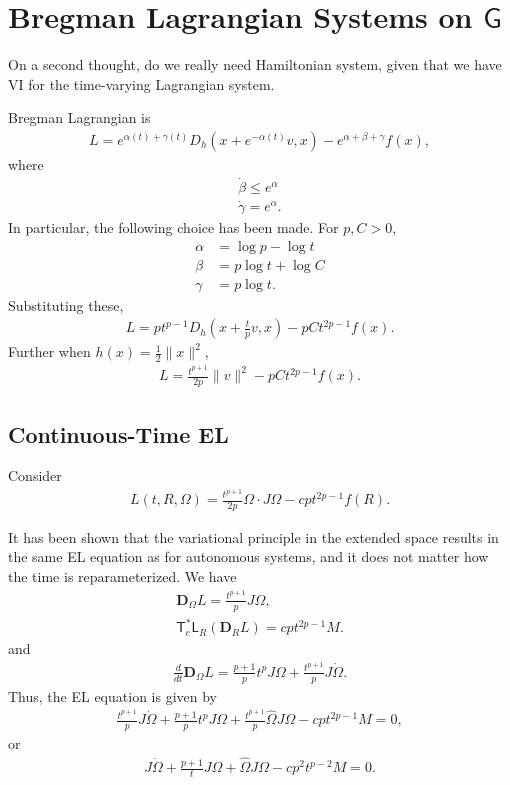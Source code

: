 \documentclass[letterpaper, 10pt, conference]{ieeeconf}
\newcommand{\G}{\ensuremath{\mathsf{G}}}
\newcommand{\T}{\ensuremath{\mathsf{T}}}
\renewcommand{\L}{\ensuremath{\mathsf{L}}}
\newcommand{\D}{\ensuremath{\mathbf{D}}}
\begin{document}
\section{Bregman Lagrangian Systems on $\G$}

On a second thought, do we really need Hamiltonian system, given that we have VI for the time-varying Lagrangian system. 

Bregman Lagrangian is
\begin{align*}
    L = e^{\alpha(t)+\gamma(t)} D_h(x+ e^{-\alpha(t)} v, x) - e^{\alpha+\beta+\gamma} f(x),
\end{align*}
where 
\begin{align*}
    \dot\beta \leq e^\alpha\\
    \dot \gamma = e^\alpha.
\end{align*}
In particular, the following choice has been made. 
For $p,C>0$,
\begin{align*}
    \alpha & = \log p - \log t\\
    \beta & = p\log t + \log C\\
    \gamma & = p \log t.
\end{align*}
Substituting these,
\begin{align*}
    L = p t^{p-1} D_h(x+ \frac{t}{p} v, x) - p C t^{2p-1} f(x).
\end{align*}
Further when $h(x)=\frac{1}{2}\|x\|^2$, 
\begin{align*}
    L = \frac{t^{p+1}}{2p} \| v\|^2 - p C t^{2p-1} f(x).
\end{align*}


\subsection{Continuous-Time EL}

Consider
\begin{align*}
    L(t,R,\Omega) = \frac{t^{p+1}}{2p} \Omega\cdot J\Omega - cpt^{2p-1} f(R).
\end{align*}

It has been shown that the variational principle in the extended space results in the same EL equation as for autonomous systems, and it does not matter how the time is reparameterized. 
We have
\begin{align*}
    \D_\Omega L = \frac{t^{p+1}}{p} J\Omega,\\
    \T^*_e \L_R( \D_R L) = cpt^{2p-1} M.
\end{align*}
and
\begin{align*}
    \frac{d}{dt} \D_\Omega L = \frac{p+1}{p} t^p J\Omega + \frac{t^{p+1}}{p} J\dot\Omega.
\end{align*}
Thus, the EL equation is given by
\begin{align*}
    \frac{t^{p+1}}{p} J\dot\Omega + \frac{p+1}{p} t^p J\Omega + \frac{t^{p+1}}{p} \hat\Omega J\Omega - cpt^{2p-1} M = 0,
\end{align*}
or
\begin{align*}
    J\dot\Omega + \frac{p+1}{t} J\Omega + \hat\Omega J\Omega - c p^2 t^{p-2} M = 0.
\end{align*}
\end{document}
